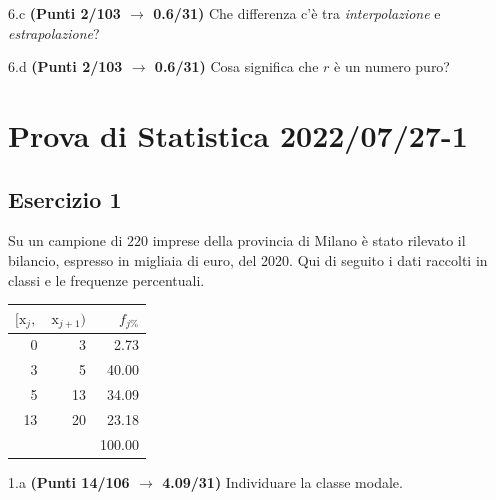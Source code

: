 \documentclass[
  11pt,
]{book}
\theoremstyle{mytheoremstyle}
\theoremstyle{mydefstyle}
\newenvironment{sol}
  {
  \begin{tcolorbox}[enhanced,breakable,arc=0.1mm,boxrule=1pt,colback=white,colframe=iblue,
  title=\bf \fontfamily{lmss}\selectfont \hspace{.5 cm} Soluzione,drop fuzzy shadow]

}{
\end{tcolorbox}
  }
\begin{document}
6.c \textbf{(Punti 2/103 \(\rightarrow\) 0.6/31)} Che differenza c'è tra \emph{interpolazione} e \emph{estrapolazione}?

6.d \textbf{(Punti 2/103 \(\rightarrow\) 0.6/31)} Cosa significa che \(r\) è un numero puro?

\section{Prova di Statistica 2022/07/27-1}\label{prova-di-statistica-20220727-1}

\subsection{Esercizio 1}\label{esercizio-1-17}

Su un campione di \(220\) imprese della provincia di Milano è stato
rilevato il bilancio, espresso in migliaia di euro, del 2020. Qui di seguito i dati raccolti in classi
e le frequenze percentuali.

\begin{sol}

\begin{table}[H]
\centering
\begin{tabular}{rrr}
\toprule
$[\text{x}_j,$ & $\text{x}_{j+1})$ & $f_{j\%}$\\
\midrule
0 & 3 & 2.73\\
3 & 5 & 40.00\\
5 & 13 & 34.09\\
13 & 20 & 23.18\\
 &  & 100.00\\
\bottomrule
\end{tabular}
\end{table}

\end{sol}

1.a \textbf{(Punti 14/106 \(\rightarrow\) 4.09/31)} Individuare la classe modale.
\end{document}

